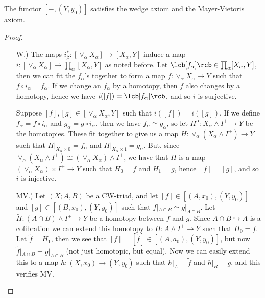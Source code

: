 \begin{lem}
The functor $[-,(Y,y_0)]$ satisfies the wedge axiom and the Mayer-Vietoris axiom.
\end{lem}
\begin{proof}
\sloppyspace
\begin{enumerate}

  \item[W.)] The maps $i_\beta^* : [\vee_\alpha X_\alpha] \rightarrow [X_\alpha,Y]$ induce a map $i : [\vee_\alpha X_\alpha] \rightarrow \prod_\alpha [X_\alpha,Y]$ as noted before. Let $\lcb [f_\alpha] \rcb \in \prod_\alpha [X_\alpha,Y]$, then we can fit the $f_\alpha$'s together to form a map $f : \vee_\alpha X_\alpha \rightarrow Y$ such that $f \circ i_\alpha = f_\alpha$. If we change an $f_\alpha$ by a homotopy, then $f$ also changes by a homotopy, hence we have $i([f]) = \lcb [f_\alpha] \rcb$, and so $i$ is surjective.
  
  Suppose $[f],[g] \in [\vee_\alpha X_\alpha,Y]$ such that $i([f]) = i([g])$. If we define $f_\alpha = f \circ i_\alpha$ and $g_\alpha = g \circ i_\alpha$, then we have $f_\alpha \simeq g_\alpha$, so let $H^\alpha : X_\alpha \wedge I^+ \rightarrow Y$ be the homotopies. These fit together to give us a map $H : \vee_\alpha (X_\alpha \wedge I^+) \rightarrow Y$ such that $H|_{X_\alpha \times 0} = f_\alpha$ and $H|_{X_\alpha \times 1} = g_\alpha$. But, since $\vee_\alpha (X_\alpha \wedge I^+) \cong (\vee_\alpha X_\alpha) \wedge I^+$, we have that $H$ is a map $(\vee_\alpha X_\alpha) \times I^+ \rightarrow Y$ such that $H_0 = f$ and $H_1 = g$, hence $[f] = [g]$, and so $i$ is injective.
  
  \item[MV.)] Let $(X;A,B)$ be a CW-triad, and let $[f] \in [(A,x_0),(Y,y_0)]$ and $[g] \in [(B,x_0),(Y,y_0)]$ such that $f|_{A \cap B} \simeq g|_{A \cap B}$. Let $\widetilde{H} : (A \cap B) \wedge I^+ \rightarrow Y$ be a homotopy between $f$ and $g$. Since $A \cap B \hookrightarrow A$ is a cofibration we can extend this homotopy to $H : A \wedge I^+ \rightarrow Y$ such that $H_0 = f$. Let $\widetilde{f} = H_1$, then we see that $[f]=[\widetilde{f}] \in [(A,a_0),(Y,y_0)]$, but now $\widetilde{f}|_{A \cap B} = g|_{A \cap B}$ (not just homotopic, but equal). Now we can easily extend this to a map $h : (X,x_0) \rightarrow (Y,y_0)$ such that $h|_A = \widetilde{f}$ and $h|_B = g$, and this verifies MV.
\end{enumerate}
\end{proof}



